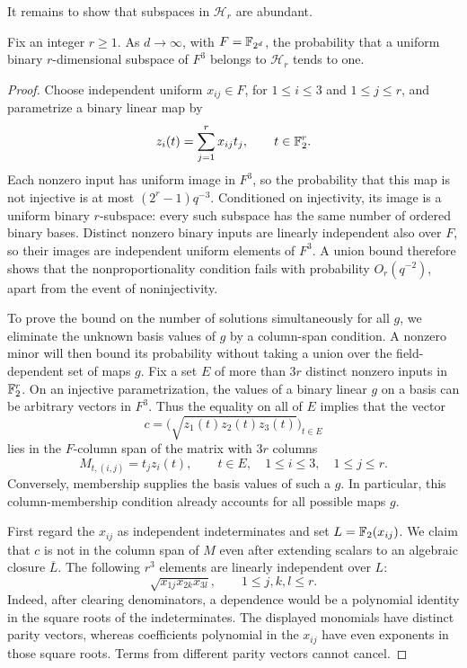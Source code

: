 It remains to show that subspaces in $\mathcal H_r$ are abundant.

\begin{lemma}\label{lem:equivariant-noise-subspace-conditions}
Fix an integer $r\ge1$.  As $d\to\infty$, with $F=\mathbb F_{2^d}$,
the probability that a uniform binary $r$-dimensional subspace of $F^3$
belongs to $\mathcal H_r$ tends to one.
\end{lemma}

\begin{proof}
Choose independent uniform $x_{ij}\in F$, for $1\le i\le3$ and
$1\le j\le r$, and parametrize a binary linear map by
\[
 z_i(t)=\sum_{j=1}^r x_{ij}t_j,
 \qquad t\in\mathbb F_2^r.
\]
Each nonzero input has uniform image in $F^3$, so the probability that this
map is not injective is at most $(2^r-1)q^{-3}$.  Conditioned on
injectivity, its image is a uniform binary $r$-subspace: every such
subspace has the same number of ordered binary bases.  Distinct nonzero
binary inputs are linearly independent also over $F$, so their images are
independent uniform elements of $F^3$.  A union bound therefore shows that
the nonproportionality condition fails with probability $O_r(q^{-2})$,
apart from the event of noninjectivity.

To prove the bound on the number of solutions simultaneously for all $g$, we eliminate
the unknown basis values of $g$ by a column-span condition.  A nonzero
minor will then bound its probability without taking a union over the
field-dependent set of maps $g$.
Fix a set $E$ of more than $3r$ distinct nonzero inputs in $\mathbb F_2^r$.
On an injective parametrization, the values of a binary linear $g$ on a
basis can be arbitrary vectors in $F^3$.  Thus the equality on all of $E$
implies that the vector
\[
 c=\bigl(\sqrt{z_1(t)z_2(t)z_3(t)}\bigr)_{t\in E}
\]
lies in the $F$-column span of the matrix with $3r$ columns
\[
 M_{t,(i,j)}=t_jz_i(t),
 \qquad t\in E,\quad 1\le i\le3,\quad 1\le j\le r.
\]
Conversely, membership supplies the basis values of such a $g$.
In particular, this column-membership condition already accounts for all
possible maps $g$.

First regard the $x_{ij}$ as independent indeterminates and set
$L=\mathbb F_2(x_{ij})$.  We claim that $c$ is not in the column span of $M$ even
after extending scalars to an algebraic closure $\overline L$.
The following $r^3$ elements are linearly independent over $L$:
\[
 \sqrt{x_{1j}x_{2k}x_{3l}},
 \qquad 1\le j,k,l\le r.
\]
Indeed, after clearing denominators, a dependence would be a polynomial
identity in the square roots of the
indeterminates.  The displayed monomials have distinct parity vectors,
whereas coefficients polynomial in the $x_{ij}$ have even exponents in
those square roots.  Terms from different parity vectors cannot cancel.


\end{proof}
